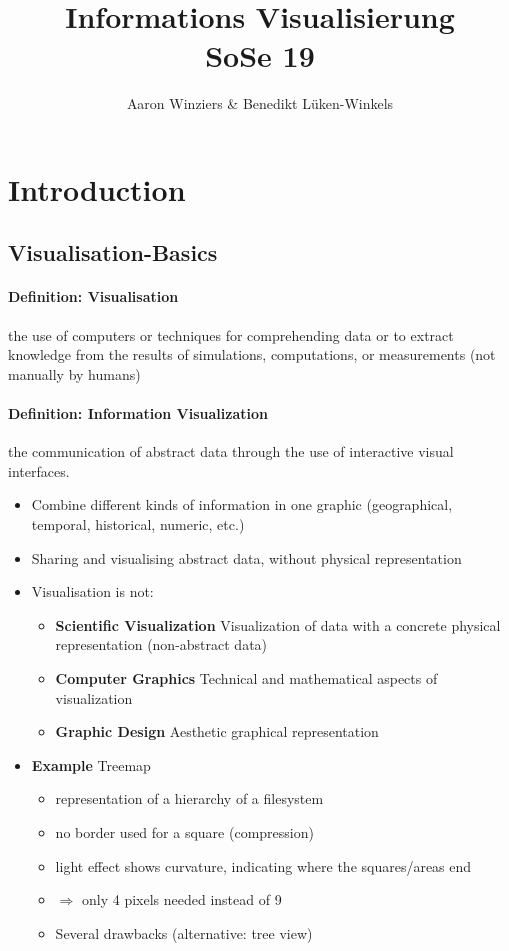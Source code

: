 \documentclass[10pt,a4paper]{article}
\author{Aaron Winziers \& Benedikt Lüken-Winkels}
\title{Informations Visualisierung \\ SoSe 19}
\begin{document}
\maketitle
\tableofcontents
\newpage

\section{Introduction}
	\subsection{Visualisation-Basics}
	\paragraph*{Definition: Visualisation} 
	the use of computers or techniques for comprehending data or to extract knowledge from the results of simulations, computations, or measurements (not manually by humans)
	\paragraph*{Definition: Information Visualization}
	the communication of abstract data through the use of interactive visual interfaces.
	\begin{itemize}
		\item Combine different kinds of information in one graphic (geographical, temporal, historical, numeric, etc.)
		\item Sharing and visualising abstract data, without physical representation 
		\item Visualisation is not:
		\begin{itemize}
			\item \textbf{Scientific Visualization} Visualization of data with a concrete physical representation (non-abstract data)
			\item \textbf{Computer Graphics} Technical and mathematical aspects of visualization
			\item \textbf{Graphic Design} Aesthetic graphical representation
		\end{itemize}
		\item \textbf{Example} Treemap
		\begin{itemize}
			\item representation of a hierarchy of a filesystem
			\item no border used for a square (compression)
			\item light effect shows curvature, indicating where the squares/areas end 
			\item $ \Rightarrow $ only 4 pixels needed instead of 9
			\item Several drawbacks (alternative: tree view)
		\end{itemize}
	\end{itemize}
\end{document}
